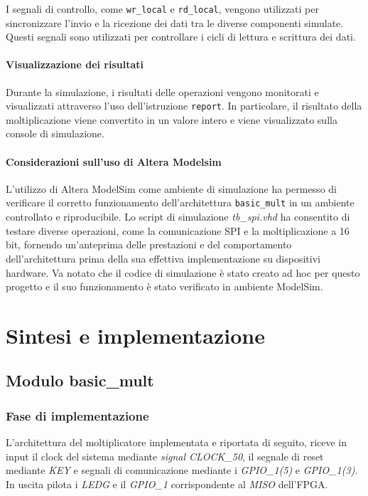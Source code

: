 \documentclass[titlepage]{report}
\begin{document}
				I segnali di controllo, come \texttt{wr\_local} e \texttt{rd\_local}, vengono utilizzati per sincronizzare l'invio e la ricezione dei dati tra le diverse componenti simulate. Questi segnali sono utilizzati per controllare i cicli di lettura e scrittura dei dati.

			\subsubsection{Visualizzazione dei risultati}

				Durante la simulazione, i risultati delle operazioni vengono monitorati e visualizzati attraverso l'uso dell'istruzione \texttt{report}. In particolare, il risultato della moltiplicazione viene convertito in un valore intero e viene visualizzato sulla console di simulazione.

			\subsubsection{Considerazioni sull'uso di Altera Modelsim}

				L'utilizzo di Altera ModelSim come ambiente di simulazione ha permesso di verificare il corretto funzionamento dell'architettura \texttt{basic\_mult} in un ambiente controllato e riproducibile. Lo script di simulazione \textit{tb\_spi.vhd} ha consentito di testare diverse operazioni, come la comunicazione SPI e la moltiplicazione a 16 bit, fornendo un'anteprima delle prestazioni e del comportamento dell'architettura prima della sua effettiva implementazione su dispositivi hardware. Va notato che il codice di simulazione è stato creato ad hoc per questo progetto e il suo funzionamento è stato verificato in ambiente ModelSim.


\chapter*{Sintesi e implementazione}
\label{ch:sintesi_implementazione}
	\section*{Modulo basic\_mult}
	\label{sec:modulo_basic_mult}
		\subsection*{Fase di implementazione}
		\label{subsec:basic_mult_implementazione}
			L'architettura del moltiplicatore implementata e riportata di seguito, riceve in input il clock del sistema mediante \textit{signal CLOCK\_50}, il segnale di reset mediante \textit{KEY} e segnali di comunicazione mediante i \textit{GPIO\_1(5)} e \textit{GPIO\_1(3)}. In uscita pilota i \textit{LEDG} e il \textit{GPIO\_1} corrispondente al \textit{MISO} dell'FPGA.
\end{document}
